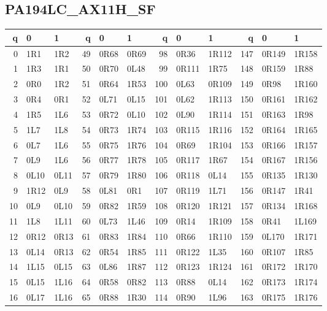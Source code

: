 \subsection*{PA194LC\_AX11H\_SF}
\begin{center}
\begingroup\ttfamily\fontsize{9}{10.4}\selectfont
\setlength{\tabcolsep}{4pt}
\begin{tabular}{rll@{\hspace{1.2em}}rll@{\hspace{1.2em}}rll@{\hspace{1.2em}}rll}
\toprule q & 0 & 1 & q & 0 & 1 & q & 0 & 1 & q & 0 & 1\\\midrule
0 & 1R1 & 1R2 & 49 & 0R68 & 0R69 & 98 & 0R36 & 1R112 & 147 & 0R149 & 1R158\\
1 & 1R3 & 1R1 & 50 & 0R70 & 0L48 & 99 & 0R111 & 1R75 & 148 & 0R159 & 1R88\\
2 & 0R0 & 1R2 & 51 & 0R64 & 1R53 & 100 & 0L63 & 0R109 & 149 & 0R98 & 1R160\\
3 & 0R4 & 0R1 & 52 & 0L71 & 0L15 & 101 & 0L62 & 1R113 & 150 & 0R161 & 1R162\\
4 & 1R5 & 1L6 & 53 & 0R72 & 0L10 & 102 & 0L90 & 1R114 & 151 & 0R163 & 1R98\\
5 & 1L7 & 1L8 & 54 & 0R73 & 1R74 & 103 & 0R115 & 1R116 & 152 & 0R164 & 1R165\\
6 & 0L7 & 1L6 & 55 & 0R75 & 1R76 & 104 & 0R69 & 1R104 & 153 & 0R166 & 1R157\\
7 & 0L9 & 1L6 & 56 & 0R77 & 1R78 & 105 & 0R117 & 1R67 & 154 & 0R167 & 1R156\\
8 & 0L10 & 0L11 & 57 & 0R79 & 1R80 & 106 & 0R118 & 0L14 & 155 & 0R135 & 1R130\\
9 & 1R12 & 0L9 & 58 & 0L81 & 0R1 & 107 & 0R119 & 1L71 & 156 & 0R147 & 1R41\\
10 & 0L9 & 0L10 & 59 & 0R82 & 1R59 & 108 & 0R120 & 1R121 & 157 & 0R134 & 1R168\\
11 & 1L8 & 1L11 & 60 & 0L73 & 1L46 & 109 & 0R14 & 1R109 & 158 & 0R41 & 1L169\\
12 & 0R12 & 0R13 & 61 & 0R83 & 1R84 & 110 & 0R66 & 1R110 & 159 & 0L170 & 1R171\\
13 & 0L14 & 0R13 & 62 & 0R54 & 1R85 & 111 & 0R122 & 1L35 & 160 & 0R107 & 1R85\\
14 & 1L15 & 0L15 & 63 & 0L86 & 1R87 & 112 & 0R123 & 1R124 & 161 & 0R172 & 1R170\\
15 & 0L15 & 1L16 & 64 & 0R58 & 0R82 & 113 & 0R88 & 0L14 & 162 & 0R173 & 1R174\\
16 & 0L17 & 1L16 & 65 & 0R88 & 1R30 & 114 & 0R90 & 1L96 & 163 & 0R175 & 1R176\\

\end{tabular}
\end{center}
